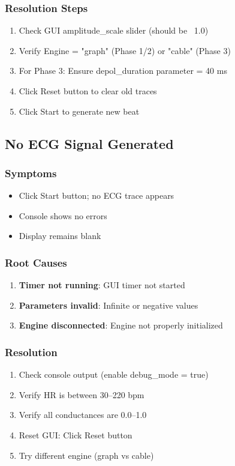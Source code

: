 \documentclass[11pt, a4paper]{article}
\begin{document}
\subsubsection{Resolution Steps}
\begin{enumerate}
    \item Check GUI amplitude\_scale slider (should be ~1.0)
    \item Verify Engine = "graph" (Phase 1/2) or "cable" (Phase 3)
    \item For Phase 3: Ensure depol\_duration parameter = 40 ms
    \item Click Reset button to clear old traces
    \item Click Start to generate new beat
\end{enumerate}

\subsection{No ECG Signal Generated}

\subsubsection{Symptoms}
\begin{itemize}
    \item Click Start button; no ECG trace appears
    \item Console shows no errors
    \item Display remains blank
\end{itemize}

\subsubsection{Root Causes}
\begin{enumerate}
    \item \textbf{Timer not running}: GUI timer not started
    \item \textbf{Parameters invalid}: Infinite or negative values
    \item \textbf{Engine disconnected}: Engine not properly initialized
\end{enumerate}

\subsubsection{Resolution}
\begin{enumerate}
    \item Check console output (enable debug\_mode = true)
    \item Verify HR is between 30--220 bpm
    \item Verify all conductances are 0.0--1.0
    \item Reset GUI: Click Reset button
    \item Try different engine (graph vs cable)
\end{enumerate}
\end{document}
